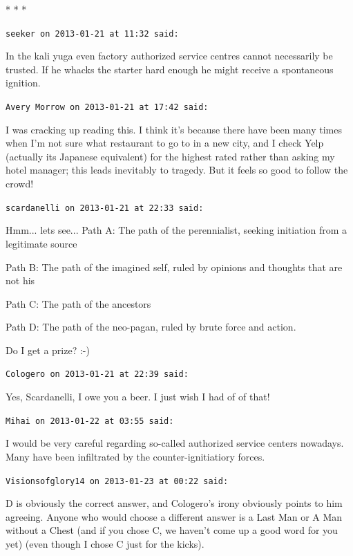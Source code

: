 
\begin{center}* * *\end{center}

\begin{footnotesize}
\begin{sffamily}
\texttt{seeker on 2013-01-21 at 11:32 said:}

In the kali yuga even factory authorized service centres cannot necessarily be trusted. If he whacks the starter hard enough he might receive a spontaneous ignition.

\hfill

\texttt{Avery Morrow on 2013-01-21 at 17:42 said:}

I was cracking up reading this. I think it's because there have been many times when I'm not sure what restaurant to go to in a new city, and I check Yelp (actually its Japanese equivalent) for the highest rated rather than asking my hotel manager; this leads inevitably to tragedy. But it feels so good to follow the crowd!

\hfill

\texttt{scardanelli on 2013-01-21 at 22:33 said:}

Hmm... lets see... Path A: The path of the perennialist, seeking initiation from a legitimate source

Path B: The path of the imagined self, ruled by opinions and thoughts that are not his

Path C: The path of the ancestors

Path D: The path of the neo-pagan, ruled by brute force and action.

Do I get a prize? :-)

\hfill

\texttt{Cologero on 2013-01-21 at 22:39 said:}

Yes, Scardanelli, I owe you a beer. I just wish I had of of that!

\hfill

\texttt{Mihai on 2013-01-22 at 03:55 said:}

I would be very careful regarding so-called authorized service centers nowadays. Many have been infiltrated by the counter-ignitiatiory forces.

\hfill

\texttt{Visionsofglory14 on 2013-01-23 at 00:22 said:}

D is obviously the correct answer, and Cologero's irony obviously points to him agreeing. Anyone who would choose a different answer is a Last Man or A Man without a Chest (and if you chose C, we haven't come up a good word for you yet) (even though I chose C just for the kicks).


\end{sffamily}
\end{footnotesize}
